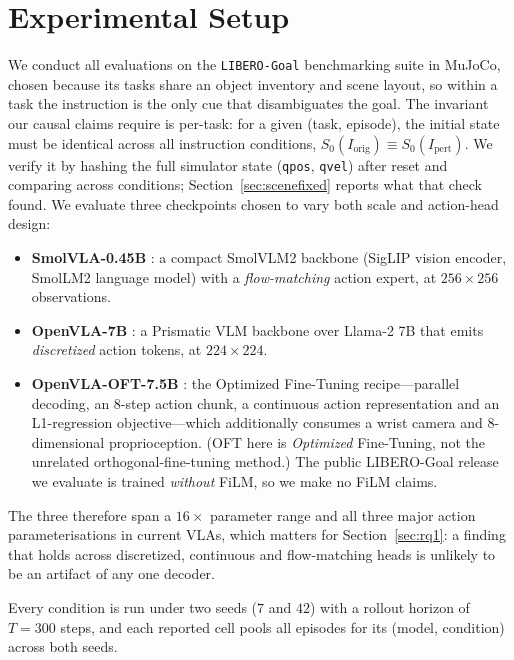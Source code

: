 \documentclass[11pt]{article}
\begin{document}
\section{Experimental Setup}
We conduct all evaluations on the \texttt{LIBERO-Goal} benchmarking suite in
MuJoCo, chosen because its tasks share an object inventory and scene layout, so
within a task the instruction is the only cue that disambiguates the goal. The
invariant our causal claims require is per-task: for a given (task, episode), the
initial state must be identical across all instruction conditions,
$S_0(I_{\text{orig}}) \equiv S_0(I_{\text{pert}})$. We verify it by hashing the
full simulator state (\texttt{qpos}, \texttt{qvel}) after reset and comparing
across conditions; Section~\ref{sec:scenefixed} reports what that check found. We
evaluate three checkpoints chosen to vary both scale and action-head design:
\begin{itemize}
\item \textbf{SmolVLA-0.45B} \citep{shukor2025smolvla}: a compact SmolVLM2
  backbone (SigLIP vision encoder, SmolLM2 language model) with a
  \emph{flow-matching} action expert, at $256\times256$ observations.
\item \textbf{OpenVLA-7B} \citep{kim2025openvla}: a Prismatic VLM backbone over
  Llama-2 7B that emits \emph{discretized} action tokens, at $224\times224$.
\item \textbf{OpenVLA-OFT-7.5B} \citep{kim2025oft}: the Optimized Fine-Tuning
  recipe---parallel decoding, an 8-step action chunk, a continuous action
  representation and an L1-regression objective---which additionally consumes a
  wrist camera and 8-dimensional proprioception. (OFT here is
  \emph{Optimized} Fine-Tuning, not the unrelated orthogonal-fine-tuning method.)
  The public LIBERO-Goal release we evaluate is trained \emph{without} FiLM, so we
  make no FiLM claims.
\end{itemize}
The three therefore span a $16\times$ parameter range and all three major action
parameterisations in current VLAs, which matters for Section~\ref{sec:rq1}: a
finding that holds across discretized, continuous and flow-matching heads is
unlikely to be an artifact of any one decoder.

Every condition is run under two seeds ($7$ and $42$) with a rollout horizon of
$T=300$ steps, and each reported cell pools all episodes for its (model, condition)
across both seeds.
\end{document}
